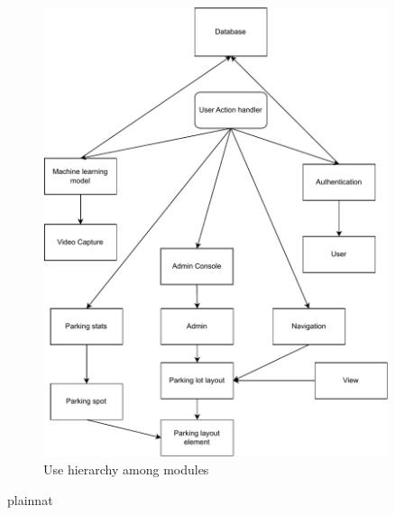 \documentclass[12pt, titlepage]{article}
\begin{document}
\begin{figure}[H]
\centering
\includegraphics[width=0.9\textwidth]{UsesDiagram.pdf}
\caption{Use hierarchy among modules}
\label{FigUH}
\end{figure}


\newpage

 {plainnat}


\newpage{}
\end{document}
